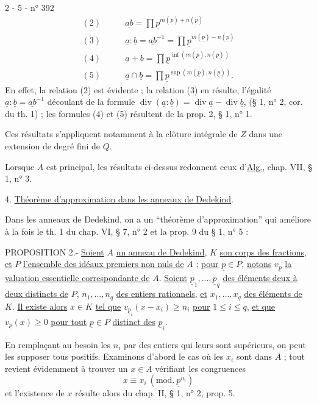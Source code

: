 2 - 5 - \hfill n° 392
\[
\begin{aligned}
(2)\qquad &\underline{ab}=\prod\underline p^{m(\underline p)+n(\underline p)}\\
(3)\qquad &\underline a:\underline b=\underline{ab}^{-1}=\prod\underline p^{m(\underline p)-n(\underline p)}\\
(4)\qquad &\underline a+\underline b=\prod\underline p^{\inf(m(\underline p),n(\underline p))}\\
(5)\qquad &\underline a\cap\underline b=\prod\underline p^{\sup(m(\underline p),n(\underline p))}.
\end{aligned}
\]
En effet, la relation (2) est évidente ; la relation (3) en résulte, l'égalité $\underline a:\underline b=\underline{ab}^{-1}$ découlant de la formule $\operatorname{div}(\underline a:\underline b)=\operatorname{div}\underline a-\operatorname{div}\underline b$, (§ 1, n° 2, cor. du th. 1) ; les formules (4) et (5) résultent de la prop. 2, § 1, n° 1.

Ces résultats s'appliquent notamment à la clôture intégrale de $Z$ dans une extension de degré fini de $Q$.

Lorsque $A$ est principal, les résultats ci-dessus redonnent ceux d'\uline{Alg.}, chap. VII, § 1, n° 3.

4. \uline{Théorème d'approximation dans les anneaux de Dedekind}.

Dans les anneaux de Dedekind, on a un ``théorème d'approximation'' qui améliore à la fois le th. 1 du chap. VI, § 7, n° 2 et la prop. 9 du § 1, n° 5 :

PROPOSITION 2.- \uline{Soient} $A$ \uline{un anneau de Dedekind}, $K$ \uline{son corps des fractions}, \uline{et} $P$ \uline{l'ensemble des idéaux premiers non nuls de} $A$ ; \uline{pour} $\underline p\in P$, \uline{notons} $v_{\underline p}$ \uline{la valuation essentielle correspondante de} $A$. \uline{Soient} $\underline p_1,\ldots,\underline p_q$ \uline{des éléments deux à deux distincts de} $P$, $n_1,\ldots,n_q$ \uline{des entiers rationnels}, \uline{et} $x_1,\ldots,x_q$ \uline{des éléments de} $K$. \uline{Il existe alors} $x\in K$ \uline{tel que} $v_{\underline p_i}(x-x_i)\ge n_i$ \uline{pour} $1\le i\le q$, \uline{et que} $v_{\underline p}(x)\ge0$ \uline{pour tout} $\underline p\in P$ \uline{distinct des} $\underline p_i$.

En remplaçant au besoin les $n_i$ par des entiers qui leurs sont supérieurs, on peut les supposer tous positifs. Examinons d'abord le cas où les $x_i$ sont dans $A$ ; tout revient évidemment à trouver un $x\in A$ vérifiant les congruences
\[
x\equiv x_i\ (\mathrm{mod.}\ \underline p^{n_i})
\]
et l'existence de $x$ résulte alors du chap. II, § 1, n° 2, prop. 5.
